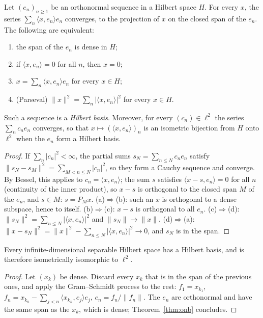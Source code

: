 \begin{theorem}\label{thm:onb}
Let $(e_n)_{n\ge1}$ be an orthonormal sequence in a Hilbert space $H$. For every $x$, the series $\sum_n\langle x,e_n\rangle e_n$ converges, to the projection of $x$ on the closed span of the $e_n$. The following are equivalent:
\begin{enumerate}
\item[(a)] the span of the $e_n$ is dense in $H$;
\item[(b)] if $\langle x,e_n\rangle=0$ for all $n$, then $x=0$;
\item[(c)] $x=\sum_n\langle x,e_n\rangle e_n$ for every $x\in H$;
\item[(d)] (Parseval) $\|x\|^2=\sum_n|\langle x,e_n\rangle|^2$ for every $x\in H$.
\end{enumerate}
Such a sequence is a \emph{Hilbert basis}. Moreover, for every $(c_n)\in\ell^2$ the series $\sum_nc_ne_n$ converges, so that $x\mapsto(\langle x,e_n\rangle)_n$ is an isometric bijection from $H$ onto $\ell^2$ when the $e_n$ form a Hilbert basis.
\end{theorem}
\begin{proof}
If $\sum_n|c_n|^2<\infty$, the partial sums $s_N=\sum_{n\le N}c_ne_n$ satisfy $\|s_N-s_M\|^2=\sum_{M<n\le N}|c_n|^2$, so they form a Cauchy sequence and converge. By Bessel, this applies to $c_n=\langle x,e_n\rangle$; the sum $s$ satisfies
$\langle x-s,e_n\rangle=0$ for all $n$ (continuity of the inner product), so $x-s$ is orthogonal to the closed span $M$ of the $e_n$, and $s\in M$: $s=P_Mx$. (a)$\Rightarrow$(b): such an $x$ is orthogonal to a dense subspace, hence to
itself. (b)$\Rightarrow$(c): $x-s$ is orthogonal to all $e_n$. (c)$\Rightarrow$(d): $\|s_N\|^2=\sum_{n\le N}|\langle x,e_n\rangle|^2$ and $\|s_N\|\to\|x\|$. (d)$\Rightarrow$(a): $\|x-s_N\|^2=\|x\|^2-\sum_{n\le N}|\langle x,e_n\rangle|^2\to0$, and $s_N$
is in the span.
\end{proof}

\begin{corollary}\label{cor:separable}
Every infinite-dimensional separable Hilbert space has a Hilbert basis, and is therefore isometrically isomorphic to $\ell^2$.
\end{corollary}
\begin{proof}
Let $(x_k)$ be dense. Discard every $x_k$ that is in the span of the previous ones, and apply the Gram--Schmidt process to the rest: $f_1=x_{k_1}$, $f_n=x_{k_n}-\sum_{j<n}\langle x_{k_n},e_j\rangle e_j$, $e_n=f_n/\|f_n\|$. The $e_n$ are orthonormal
and have the same span as the $x_k$, which is dense; Theorem~\ref{thm:onb} concludes.
\end{proof}


